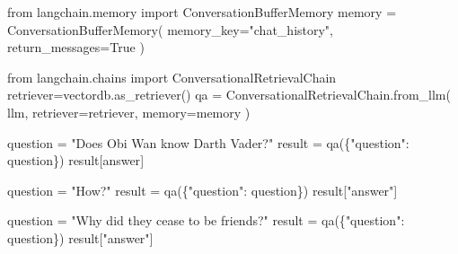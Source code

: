 \documentclass[
  letterpaper,
  DIV=11,
  numbers=noendperiod]{scrreprt}
\newenvironment{Shaded}{\begin{snugshade}}{\end{snugshade}}
\newcommand{\ImportTok}[1]{\textcolor[rgb]{0.00,0.46,0.62}{#1}}
\newcommand{\NormalTok}[1]{\textcolor[rgb]{0.00,0.23,0.31}{#1}}
\newcommand{\OperatorTok}[1]{\textcolor[rgb]{0.37,0.37,0.37}{#1}}
\newcommand{\StringTok}[1]{\textcolor[rgb]{0.13,0.47,0.30}{#1}}
\newcommand{\VariableTok}[1]{\textcolor[rgb]{0.07,0.07,0.07}{#1}}
\begin{document}
\begin{Shaded}
\begin{Highlighting}[]
\ImportTok{from}\NormalTok{ langchain.memory }\ImportTok{import}\NormalTok{ ConversationBufferMemory}
\NormalTok{memory }\OperatorTok{=}\NormalTok{ ConversationBufferMemory(}
\NormalTok{    memory\_key}\OperatorTok{=}\StringTok{"chat\_history"}\NormalTok{,}
\NormalTok{    return\_messages}\OperatorTok{=}\VariableTok{True}
\NormalTok{)}
\end{Highlighting}
\end{Shaded}

\begin{Shaded}
\begin{Highlighting}[]
\ImportTok{from}\NormalTok{ langchain.chains }\ImportTok{import}\NormalTok{ ConversationalRetrievalChain}
\NormalTok{retriever}\OperatorTok{=}\NormalTok{vectordb.as\_retriever()}
\NormalTok{qa }\OperatorTok{=}\NormalTok{ ConversationalRetrievalChain.from\_llm(}
\NormalTok{    llm,}
\NormalTok{    retriever}\OperatorTok{=}\NormalTok{retriever,}
\NormalTok{    memory}\OperatorTok{=}\NormalTok{memory}
\NormalTok{)}
\end{Highlighting}
\end{Shaded}

\begin{Shaded}
\begin{Highlighting}[]
\NormalTok{question }\OperatorTok{=} \StringTok{"Does Obi Wan know Darth Vader?"}
\NormalTok{result }\OperatorTok{=}\NormalTok{ qa(\{}\StringTok{"question"}\NormalTok{: question\})}
\NormalTok{result[}\StringTok{\textquotesingle{}answer\textquotesingle{}}\NormalTok{]}
\end{Highlighting}
\end{Shaded}

\begin{Shaded}
\begin{Highlighting}[]
\NormalTok{question }\OperatorTok{=} \StringTok{"How?"}
\NormalTok{result }\OperatorTok{=}\NormalTok{ qa(\{}\StringTok{"question"}\NormalTok{: question\})}
\NormalTok{result[}\StringTok{"answer"}\NormalTok{]}
\end{Highlighting}
\end{Shaded}

\begin{Shaded}
\begin{Highlighting}[]
\NormalTok{question }\OperatorTok{=} \StringTok{"Why did they cease to be friends?"}
\NormalTok{result }\OperatorTok{=}\NormalTok{ qa(\{}\StringTok{"question"}\NormalTok{: question\})}
\NormalTok{result[}\StringTok{"answer"}\NormalTok{]}
\end{Highlighting}
\end{Shaded}
\end{document}
